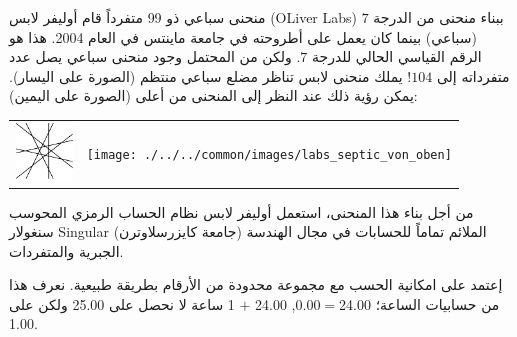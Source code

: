 \begin{surferPage}{منحنى سباعي ذو 99 متفرداً}
      قام أوليفر لابس (OLiver Labs) ببناء منحنى من الدرجة $7$ (سباعي) بينما كان يعمل على أطروحته في جامعة ماينتس في العام 2004. هذا هو الرقم القياسي الحالي للدرجة $7$. ولكن من المحتمل وجود منحنى سباعي يصل عدد متفرداته إلى $104$!  
    يملك منحنى لابس تناظر مضلع سباعي منتظم (الصورة على اليسار). يمكن رؤية ذلك عند النظر إلى المنحنى من أعلى (الصورة على اليمين):

    \vspace*{-0.3em}
    \begin{center}
      \begin{tabular}{c@{\qquad}c}
        \includegraphics[height=1.5cm]{./../../common/images/labsseptic1.pdf}
        &
        \texttt{[image: ./../../common/images/labs\_septic\_von\_oben]}
      \end{tabular}
    \end{center}
    \vspace*{-0.3em}

    من أجل بناء هذا المنحنى، استعمل أوليفر لابس نظام الحساب الرمزي المحوسب سنغولار {\sc Singular} (جامعة كايزرسلاوترن) الملائم تماماً للحسابات في مجال الهندسة الجبرية والمتفردات.
   
    إعتمد على امكانية الحسب مع مجموعة محدودة من الأرقام بطريقة طبيعية. نعرف هذا من حسابيات الساعة؛ 24.00$=$0.00, 24.00 $+$ 1 ساعة لا نحصل على 25.00 ولكن على 1.00.
\end{surferPage}
